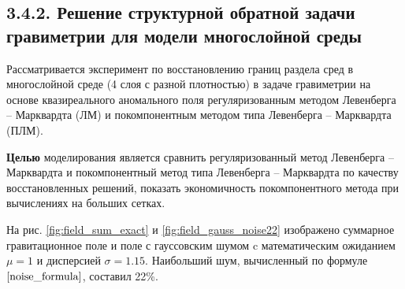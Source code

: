 %
%
% 

\newpage
\subsection*{3.4.2. Решение структурной обратной задачи гравиметрии для модели многослойной среды} 

Рассматривается эксперимент по восстановлению границ раздела сред в многослойной среде (4 слоя с разной плотностью) в задаче гравиметрии на основе квазиреального аномального поля регуляризованным методом Левенберга -- Марквардта (ЛМ) и покомпонентным методом типа Левенберга -- Марквардта (ПЛМ).

{\bfseries Целью} моделирования является сравнить регуляризованный метод Левенберга -- Марквардта и покомпонентный метод типа Левенберга -- Марквардта по качеству восстановленных решений, показать экономичность покомпонентного метода при вычислениях на больших сетках.

На рис. \ref{fig:field_sum_exact} и \ref{fig:field_gauss_noise22} изображено суммарное гравитационное поле и поле с гауссовским шумом c математическим ожиданием $\mu=1$ и дисперсией $\sigma=1.15$. Наибольший шум, вычисленный по формуле $\eqref{noise_formula}$, составил 22\%. 

